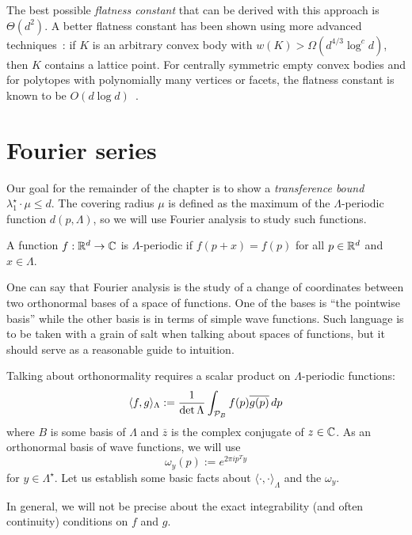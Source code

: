 The best possible \emph{flatness constant} that can be derived with this approach is $\Theta(d^2)$.
A better flatness constant has been shown using more advanced techniques~\cite{MR1854250, MR1755679}:
if $K$ is an arbitrary convex body with $w(K) > \Omega(d^{4/3} \log^c d)$,
then $K$ contains a lattice point.
For centrally symmetric empty convex bodies
and for polytopes with polynomially many vertices or facets,
the flatness constant is known to be $O(d \log d)$~\cite{MR1410163,MR1854250}.



\section{Fourier series}

Our goal for the remainder of the chapter is to show a \emph{transference bound}
$\lambda_1^\star \cdot \mu \leq d$.
The covering radius $\mu$ is defined as the maximum of the $\Lambda$-periodic function $d(p,\Lambda)$,
so we will use Fourier analysis to study such functions.

\begin{definition}
  A function $f: \mathbb{R}^d \to \mathbb{C}$ is $\Lambda$-periodic if $f(p + x) = f(p)$ for all $p \in \mathbb{R}^d$
  and $x \in \Lambda$.
\end{definition}

One can say that
Fourier analysis is the study of a change of coordinates between two orthonormal bases
of a space of functions.
One of the bases is ``the pointwise basis'' while the other basis is in terms of simple wave functions.
Such language is to be taken with a grain of salt when talking about spaces of functions,
but it should serve as a reasonable guide to intuition.

Talking about orthonormality requires a scalar product on $\Lambda$-periodic functions:
\[
  \langle f, g \rangle_\Lambda := \frac{1}{\det \Lambda} \int_{\mathcal{P}_B} f(p) \overline{g(p)} \,dp
\]
where $B$ is some basis of $\Lambda$ and $\overline{z}$ is the complex conjugate of $z \in \mathbb{C}$.
As an orthonormal basis of wave functions,
we will use
\[
  \omega_y(p) := e^{2\pi i p^T y}
\]
for $y \in \Lambda^\star$.
Let us establish some basic facts about $\langle \cdot, \cdot \rangle_\Lambda$ and the $\omega_y$.

\begin{remark}
  In general,
  we will not be precise about the exact integrability (and often continuity) conditions on $f$ and $g$.
\end{remark}

